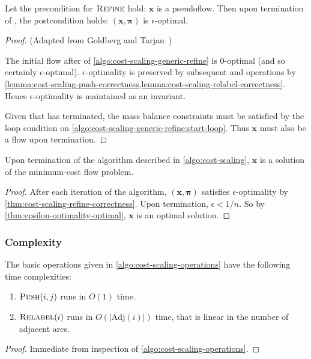 \begin{thm} \label{thm:cost-scaling-refine-correctness}
Let the precondition for $\textproc{Refine}$ hold: $\mathbf{x}$ is a pseudoflow. Then upon termination of , the postcondition holds: $\left(\mathbf{x},\boldsymbol{\pi}\right)$ is $\epsilon$-optimal.
\end{thm}
\begin{proof} (Adapted from Goldberg and Tarjan~\cite[theorem~5.4]{Goldberg:1987})
    
The initial flow after  of \cref{algo:cost-scaling-generic-refine} is $0$-optimal (and so certainly $\epsilon$-optimal). $\epsilon$-optimality is preserved by subsequent  and  operations by \cref{lemma:cost-scaling-push-correctness,lemma:cost-scaling-relabel-correctness}. Hence $\epsilon$-optimality is maintained as an invariant.
 
Given that  has terminated, the mass balance constraints must be satisfied by the loop condition on \cref{algo:cost-scaling-generic-refine:start-loop}. Thus $\mathbf{x}$ must also be a flow upon termination.
\end{proof}

\begin{cor}
Upon termination of the algorithm described in \cref{algo:cost-scaling}, $\mathbf{x}$ is a solution of the minimum-cost flow problem.  
\end{cor}
\begin{proof}
After each iteration of the algorithm, $\left(\mathbf{x},\boldsymbol{\pi}\right)$ satisfies $\epsilon$-optimality by \cref{thm:cost-scaling-refine-correctness}. Upon termination, $\epsilon < 1/n$. So by \cref{thm:epsilon-optimality-optimal}, $\mathbf{x}$ is an optimal solution.
\end{proof}

\subsubsection{Complexity}

\begin{lemma} \label{lemma:cost-scaling-operations-complexity}
The basic operations given in \cref{algo:cost-scaling-operations} have the following time complexities:
\begin{enumerate}[label=(\alph*)]
    \item $\textproc{Push}(i,j)$ runs in $O(1)$ time.
    \item $\textproc{Relabel}(i)$ runs in $O\left(\left|\mathrm{Adj}(i)\right|\right)$ time, that is linear in the number of adjacent arcs.
\end{enumerate}
\end{lemma}
\begin{proof}
Immediate from inspection of \cref{algo:cost-scaling-operations}.
\end{proof}

